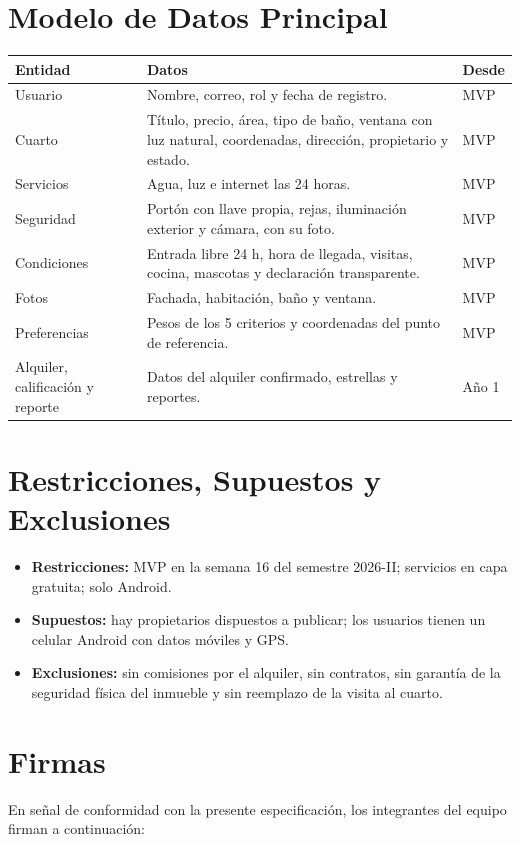 \documentclass[11pt,a4paper]{article}
\begin{document}
\section{Modelo de Datos Principal}
{\small
\noindent\begin{tabularx}{\textwidth}{@{}P{3.0cm} L C{1.4cm}@{}}
\toprule
{}
\textbf{Entidad} & \textbf{Datos} & \textbf{Desde} \\
\midrule
Usuario & Nombre, correo, rol y fecha de registro. & MVP \\
Cuarto & Título, precio, área, tipo de baño, ventana con luz natural, coordenadas, dirección, propietario y estado. & MVP \\
Servicios & Agua, luz e internet las 24 horas. & MVP \\
Seguridad & Portón con llave propia, rejas, iluminación exterior y cámara, con su foto. & MVP \\
Condiciones & Entrada libre 24 h, hora de llegada, visitas, cocina, mascotas y declaración transparente. & MVP \\
Fotos & Fachada, habitación, baño y ventana. & MVP \\
Preferencias & Pesos de los 5 criterios y coordenadas del punto de referencia. & MVP \\
Alquiler, calificación y reporte & Datos del alquiler confirmado, estrellas y reportes. & Año 1 \\
\bottomrule
\end{tabularx}
}

\section{Restricciones, Supuestos y Exclusiones}
\begin{itemize}[leftmargin=*]
    \item \textbf{Restricciones:} MVP en la semana 16 del semestre 2026-II; servicios en capa gratuita; solo Android.
    \item \textbf{Supuestos:} hay propietarios dispuestos a publicar; los usuarios tienen un celular Android con datos móviles y GPS.
    \item \textbf{Exclusiones:} sin comisiones por el alquiler, sin contratos, sin garantía de la seguridad física del inmueble y sin reemplazo de la visita al cuarto.
\end{itemize}

\section{Firmas}
\noindent En señal de conformidad con la presente especificación, los integrantes del equipo firman a continuación:
\end{document}
